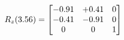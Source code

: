 \documentclass[preview]{standalone}
\begin{document}
\begin{align*}
\special{dvisvgm:raw <g id='unique000'>}R_{z}(3.56) = \begin{bmatrix}-0.91 & +0.41 & 0 \\-0.41 & -0.91 & 0 \\0 & 0 & 1\end{bmatrix}\special{dvisvgm:raw </g>}
\end{align*}
\end{document}
